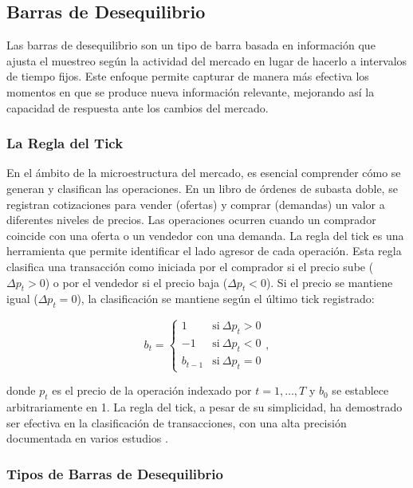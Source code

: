 \documentclass[a4paper,12pt, twoside]{report}
\begin{document}
\subsection{Barras de Desequilibrio}

Las barras de desequilibrio son un tipo de barra basada en información que ajusta el muestreo 
según la actividad del mercado en lugar de hacerlo a intervalos de tiempo fijos. Este enfoque 
permite capturar de manera más efectiva los momentos en que se produce nueva información relevante, 
mejorando así la capacidad de respuesta ante los cambios del mercado.

\subsubsection{La Regla del Tick}

En el ámbito de la microestructura del mercado, es esencial comprender cómo se generan y clasifican las operaciones. En un 
libro de órdenes de subasta doble, se registran cotizaciones para vender (ofertas) y comprar (demandas) un valor a diferentes 
niveles de precios. Las operaciones ocurren cuando un comprador coincide con una oferta o un vendedor con una demanda. La regla 
del tick es una herramienta que permite identificar el lado agresor de cada operación. Esta regla clasifica una transacción 
como iniciada por el comprador si el precio sube (\(\Delta p_t > 0\)) o por el vendedor si el precio baja (\(\Delta p_t < 0\)). 
Si el precio se mantiene igual (\(\Delta p_t = 0\)), la clasificación se mantiene según el último tick registrado:

\begin{equation}
b_t =
\begin{cases}
1 & \text{si} \ \Delta p_t > 0 \\
-1 & \text{si} \ \Delta p_t < 0 \\
b_{t-1} & \text{si} \ \Delta p_t = 0
\end{cases},
\end{equation}

donde \(p_t\) es el precio de la operación indexado por \(t = 1,\ldots,T\) y \(b_0\) se establece arbitrariamente en 1. 
La regla del tick, a pesar de su simplicidad, ha demostrado ser efectiva en la clasificación de transacciones, con una 
alta precisión documentada en varios estudios \cite{aitken1996accuracy}.

\subsubsection{Tipos de Barras de Desequilibrio}
\end{document}
